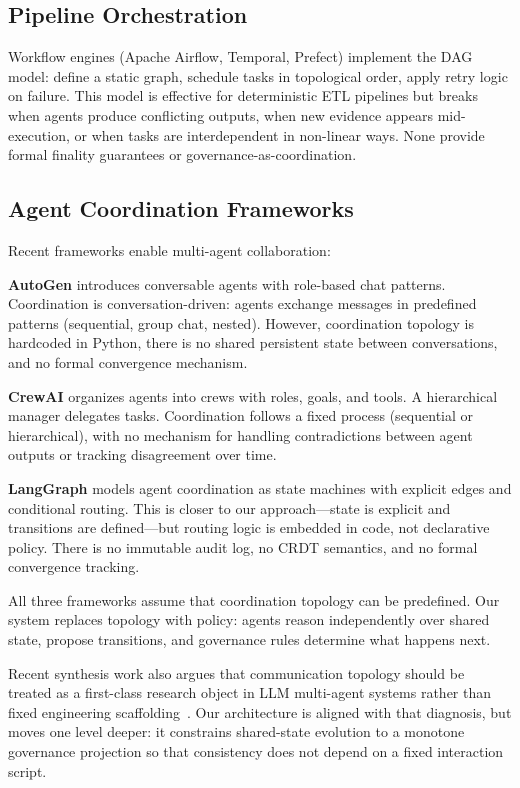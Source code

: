 \documentclass[11pt]{article}
\begin{document}
\subsection{Pipeline Orchestration}

Workflow engines (Apache Airflow, Temporal, Prefect) implement the DAG model: define a static graph, schedule tasks in topological order, apply retry logic on failure. This model is effective for deterministic ETL pipelines but breaks when agents produce conflicting outputs, when new evidence appears mid-execution, or when tasks are interdependent in non-linear ways. None provide formal finality guarantees or governance-as-coordination.

\subsection{Agent Coordination Frameworks}

Recent frameworks enable multi-agent collaboration:

\textbf{AutoGen} \cite{wu2023autogen} introduces conversable agents with role-based chat patterns. Coordination is conversation-driven: agents exchange messages in predefined patterns (sequential, group chat, nested). However, coordination topology is hardcoded in Python, there is no shared persistent state between conversations, and no formal convergence mechanism.

\textbf{CrewAI} \cite{crewai2024} organizes agents into crews with roles, goals, and tools. A hierarchical manager delegates tasks. Coordination follows a fixed process (sequential or hierarchical), with no mechanism for handling contradictions between agent outputs or tracking disagreement over time.

\textbf{LangGraph} \cite{langgraph2024} models agent coordination as state machines with explicit edges and conditional routing. This is closer to our approach---state is explicit and transitions are defined---but routing logic is embedded in code, not declarative policy. There is no immutable audit log, no CRDT semantics, and no formal convergence tracking.

All three frameworks assume that coordination topology can be predefined. Our system replaces topology with policy: agents reason independently over shared state, propose transitions, and governance rules determine what happens next.

Recent synthesis work also argues that communication topology should be treated as a first-class research object in LLM multi-agent systems rather than fixed engineering scaffolding~\cite{topologylearning2025}. Our architecture is aligned with that diagnosis, but moves one level deeper: it constrains shared-state evolution to a monotone governance projection so that consistency does not depend on a fixed interaction script.
\end{document}
